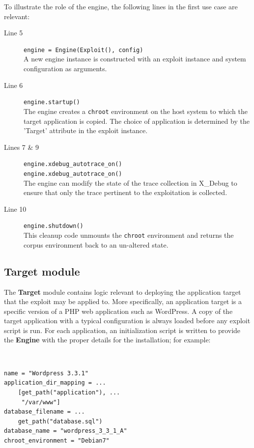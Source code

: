 \documentclass[letterpaper,twocolumn,10pt]{article}
\begin{document}
To illustrate the role of the engine, the following lines in the first use case are relevant:
\begin{description}
  \item[Line 5] {\tt \footnotesize    engine = Engine(Exploit(), config)} \\ A new engine instance is constructed with an exploit instance and system configuration as arguments.
  \item[Line 6] {\tt \footnotesize     engine.startup()} \\The engine creates a {\tt chroot} environment on the host system to which the target application is copied. The choice of application is determined by the 'Target' attribute in the exploit instance. 
  \item[Lines 7 \& 9] {\tt \footnotesize engine.xdebug\_autotrace\_on()\\ engine.xdebug\_autotrace\_on()}\\The engine can modify the state of the trace collection in X\_Debug to ensure that only the trace pertinent to the exploitation is collected.
  \item[Line 10] {\tt \footnotesize engine.shutdown()}\\This cleanup code unmounts the {\tt chroot} environment and returns the corpus environment back to an un-altered state.
\end{description}





\subsection{Target module}
The {\bf Target} module contains logic relevant to deploying the application target that the exploit may be applied to.  More specifically, an application target is a specific version of a PHP web application such as WordPress. A copy of the target application with a typical configuration is always loaded before any exploit script is run.  For each application, an initialization script is written to provide the {\bf Engine} with the proper details for the installation; for example:

\begin{minipage}{\textwidth}
{\tt \footnotesize
\begin{lstlisting}
name = "Wordpress 3.3.1"
application_dir_mapping = ...
    [get_path("application"), ...
     "/var/www"]
database_filename = ...
    get_path("database.sql")
database_name = "wordpress_3_3_1_A"
chroot_environment = "Debian7"
\end{lstlisting}
} 
\end{minipage}
\end{document}
